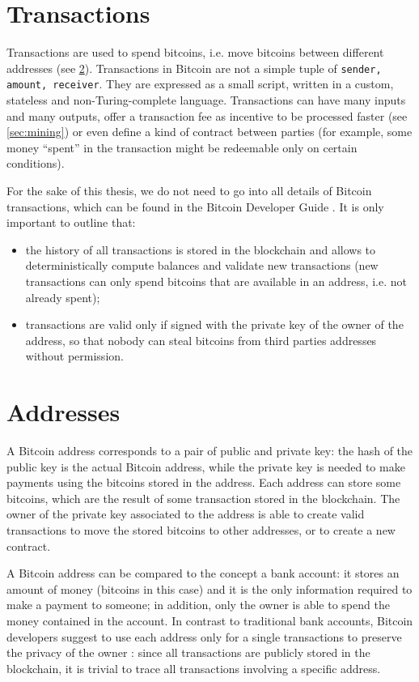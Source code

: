 \section{Transactions}
Transactions are used to spend bitcoins, i.e. move bitcoins between different addresses (see \cref{sec:addresses}).
Transactions in Bitcoin are not a simple tuple of \texttt{\textlangle sender, amount, receiver\textrangle}.
They are expressed as a small script, written in a custom, stateless and non-Turing-complete language.
Transactions can have many inputs and many outputs, offer a transaction fee as incentive to be processed faster (see \cref{sec:mining}) or even define a kind of contract between parties (for example, some money ``spent'' in the transaction might be redeemable only on certain conditions).

For the sake of this thesis, we do not need to go into all details of Bitcoin transactions, which can be found in the Bitcoin Developer Guide \cite{bitcoin_guide}.
It is only important to outline that:
\begin{itemize}
	\item the history of all transactions is stored in the blockchain and allows to deterministically compute balances and validate new transactions (new transactions can only spend bitcoins that are available in an address, i.e. not already spent);
	\item transactions are valid only if signed with the private key of the owner of the address, so that nobody can steal bitcoins from third parties addresses without permission.
\end{itemize}

\section{Addresses}
\label{sec:addresses}
A Bitcoin address corresponds to a pair of public and private key: the hash of the public key is the actual Bitcoin address, while the private key is needed to make payments using the bitcoins stored in the address.
Each address can store some bitcoins, which are the result of some transaction stored in the blockchain.
The owner of the private key associated to the address is able to create valid transactions to move the stored bitcoins to other addresses, or to create a new contract.

A Bitcoin address can be compared to the concept a bank account:
it stores an amount of money (bitcoins in this case) and it is the only information required to make a payment to someone;
in addition, only the owner is able to spend the money contained in the account.
In contrast to traditional bank accounts, Bitcoin developers suggest to use each address only for a single transactions to preserve the privacy of the owner \cite{bitcoin_guide}:
since all transactions are publicly stored in the blockchain, it is trivial to trace all transactions involving a specific address.

